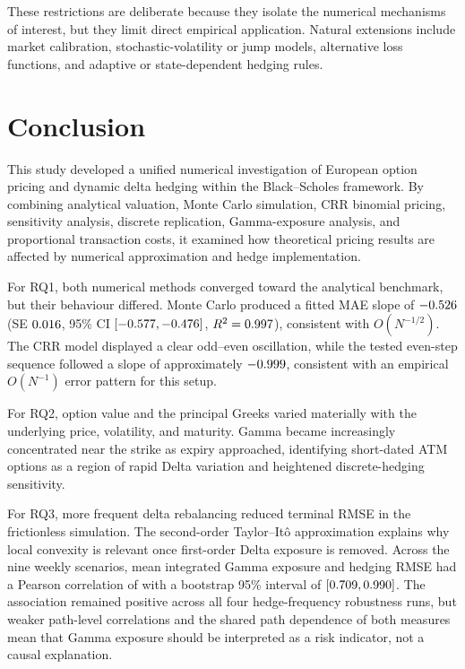 \documentclass[11pt,a4paper]{article}
\begin{document}
These restrictions are deliberate because they isolate the numerical mechanisms of interest, but they limit direct empirical application. Natural extensions include market calibration, stochastic-volatility or jump models, alternative loss functions, and adaptive or state-dependent hedging rules.

\section{Conclusion}

This study developed a unified numerical investigation of European option pricing and dynamic delta hedging within the Black--Scholes framework. By combining analytical valuation, Monte Carlo simulation, CRR binomial pricing, sensitivity analysis, discrete replication, Gamma-exposure analysis, and proportional transaction costs, it examined how theoretical pricing results are affected by numerical approximation and hedge implementation.

For RQ1, both numerical methods converged toward the analytical benchmark, but their behaviour differed. Monte Carlo produced a fitted MAE slope of $-0.526$ (SE $0.016$, 95\% CI $[-0.577,-0.476]$, $R^2=0.997$), consistent with $O(N^{-1/2})$. The CRR model displayed a clear odd--even oscillation, while the tested even-step sequence followed a slope of approximately $-0.999$, consistent with an empirical $O(N^{-1})$ error pattern for this setup.

For RQ2, option value and the principal Greeks varied materially with the underlying price, volatility, and maturity. Gamma became increasingly concentrated near the strike as expiry approached, identifying short-dated ATM options as a region of rapid Delta variation and heightened discrete-hedging sensitivity.

For RQ3, more frequent delta rebalancing reduced terminal RMSE in the frictionless simulation. The second-order Taylor--It\^o approximation explains why local convexity is relevant once first-order Delta exposure is removed. Across the nine weekly scenarios, mean integrated Gamma exposure and hedging RMSE had a Pearson correlation of \WeeklyGammaPearson{} with a bootstrap 95\% interval of $[0.709,0.990]$. The association remained positive across all four hedge-frequency robustness runs, but weaker path-level correlations and the shared path dependence of both measures mean that Gamma exposure should be interpreted as a risk indicator, not a causal explanation.
\end{document}

